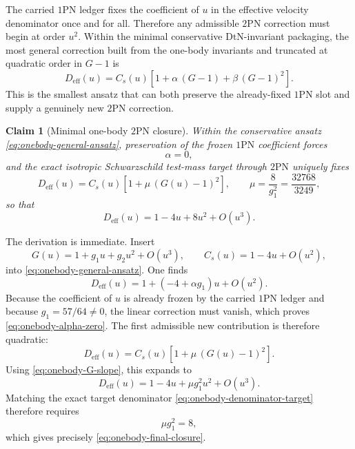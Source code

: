 \documentclass[11pt]{article}
\newcommand{\OnePN}{\mathrm{1PN}}
\newcommand{\TwoPN}{\mathrm{2PN}}
\newcommand{\DtN}{\mathrm{DtN}}
\newcommand{\eff}{\mathrm{eff}}
\newtheorem{claim}{Claim}
\begin{document}
The carried \(\OnePN\) ledger fixes the coefficient of \(u\) in the effective velocity
denominator once and for all.  Therefore any admissible \(\TwoPN\) correction must begin
at order \(u^2\).  Within the minimal conservative \(\DtN\)-invariant packaging, the most
general correction built from the one-body invariants and truncated at quadratic order in
\(G-1\) is
\begin{equation}
D_{\eff}(u)=C_s(u)\left[1+\alpha\,(G-1)+\beta\,(G-1)^2\right].
\label{eq:onebody-general-ansatz}
\end{equation}
This is the smallest ansatz that can both preserve the already-fixed \(\OnePN\) slot and
supply a genuinely new \(\TwoPN\) correction.

\begin{claim}[Minimal one-body \texorpdfstring{$2$}{2}PN closure]
\label{clm:one-body-slot}
Within the conservative ansatz \cref{eq:onebody-general-ansatz}, preservation of the
frozen \(\OnePN\) coefficient forces
\begin{equation}
\alpha=0,
\label{eq:onebody-alpha-zero}
\end{equation}
and the exact isotropic Schwarzschild test-mass target through \(\TwoPN\) uniquely fixes
\begin{equation}
D_{\eff}(u)
=C_s(u)\left[1+\mu\,(G(u)-1)^2\right],
\qquad
\mu=\frac{8}{g_1^2}=\frac{32768}{3249},
\label{eq:onebody-final-closure}
\end{equation}
so that
\begin{equation}
D_{\eff}(u)=1-4u+8u^2+O(u^3).
\label{eq:onebody-final-target}
\end{equation}
\end{claim}

The derivation is immediate.  Insert
\begin{equation}
G(u)=1+g_1u+g_2u^2+O(u^3),
\qquad
C_s(u)=1-4u+O(u^2),
\label{eq:onebody-series-invariants}
\end{equation}
into \cref{eq:onebody-general-ansatz}.  One finds
\begin{equation}
D_{\eff}(u)=1+(-4+\alpha g_1)u+O(u^2).
\label{eq:onebody-linear-coefficient}
\end{equation}
Because the coefficient of \(u\) is already frozen by the carried \(\OnePN\) ledger and
because \(g_1=57/64\neq 0\), the linear correction must vanish, which proves
\cref{eq:onebody-alpha-zero}.  The first admissible new contribution is therefore
quadratic:
\begin{equation}
D_{\eff}(u)=C_s(u)\left[1+\mu\,(G(u)-1)^2\right].
\label{eq:onebody-quadratic-ansatz}
\end{equation}
Using \cref{eq:onebody-G-slope}, this expands to
\begin{equation}
D_{\eff}(u)=1-4u+\mu g_1^2u^2+O(u^3).
\label{eq:onebody-quadratic-series}
\end{equation}
Matching the exact target denominator \cref{eq:onebody-denominator-target} therefore
requires
\begin{equation}
\mu g_1^2=8,
\label{eq:onebody-mu-equation}
\end{equation}
which gives precisely \cref{eq:onebody-final-closure}.
\end{document}
